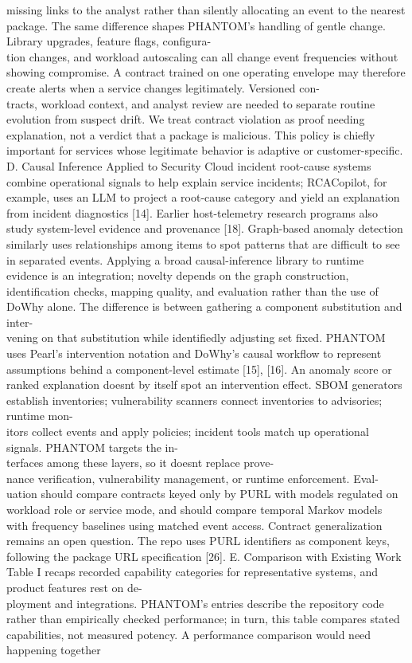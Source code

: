 \documentclass[conference]{IEEEtran}
\begin{document}
missing links to the analyst rather than silently allocating an event to the nearest package. The same difference shapes PHANTOM's handling of gentle change. Library upgrades, feature flags, configura-\\tion changes, and workload autoscaling can all change event frequencies without showing compromise. A contract trained on one operating envelope may therefore create alerts when a service changes legitimately. Versioned con-\\tracts, workload context, and analyst review are needed to separate routine evolution from suspect drift. We treat contract violation as proof needing explanation, not a verdict that a package is malicious. This policy is chiefly important for services whose legitimate behavior is adaptive or customer-specific. D. Causal Inference Applied to Security Cloud incident root-cause systems combine operational signals to help explain service incidents; RCACopilot, for example, uses an LLM to project a root-cause category and yield an explanation from incident diagnostics {[}14{]}. Earlier host-telemetry research programs also study system-level evidence and provenance {[}18{]}. Graph-based anomaly detection similarly uses relationships among items to spot patterns that are diﬀicult to see in separated events. Applying a broad causal-inference library to runtime evidence is an integration; novelty depends on the graph construction, identification checks, mapping quality, and evaluation rather than the use of DoWhy alone. The difference is between gathering a component substitution and inter-\\vening on that substitution while identifiedly adjusting set fixed. PHANTOM uses Pearl's intervention notation and DoWhy's causal workflow to represent assumptions behind a component-level estimate {[}15{]}, {[}16{]}. An anomaly score or ranked explanation doesn\textquotesingle t by itself spot an intervention effect. SBOM generators establish inventories; vulnerability scanners connect inventories to advisories; runtime mon-\\itors collect events and apply policies; incident tools match up operational signals. PHANTOM targets the in-\\terfaces among these layers, so it doesn\textquotesingle t replace prove-\\nance verification, vulnerability management, or runtime enforcement. Eval-\\uation should compare contracts keyed only by PURL with models regulated on workload role or service mode, and should compare temporal Markov models with frequency baselines using matched event access. Contract generalization remains an open question. The repo uses PURL identifiers as component keys, following the package URL specification {[}26{]}. E. Comparison with Existing Work Table I recaps recorded capability categories for representative systems, and product features rest on de-\\ployment and integrations. PHANTOM's entries describe the repository code rather than empirically checked performance; in turn, this table compares stated capabilities, not measured potency. A performance comparison would need happening together 
\end{document}
